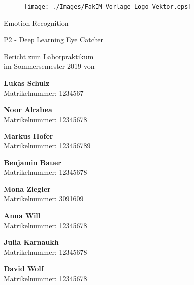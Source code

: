 \documentclass[12pt,a4paper,headinclude,twoside, plainheadsepline, open=right,numbers=noenddot]{scrreprt}
\begin{document}
\pagestyle{empty}

\clearscrheadings\clearscrplain

\begin{titlepage}
\begin{figure}[thb]
       \texttt{[image: ./Images/FakIM\_Vorlage\_Logo\_Vektor.eps]}
\end{figure}
\begin{center}
\rule{0pt}{0pt}
\vfill

\begin{huge}
Emotion Recognition\\[0.75ex]
\end{huge}
\begin{large}
P2 - Deep Learning Eye Catcher
\end{large}


\vfill
\vfill

Bericht zum Laborpraktikum\\
im Sommersemester 2019 von\\
\vfill
\setlength{\columnsep}{.0cm}
\begin{multicols}{1}

\textbf{Lukas Schulz}\\
Matrikelnummer: 1234567

\textbf{Noor Alrabea}\\
Matrikelnummer: 12345678
\end{multicols}

\begin{multicols}{2}
\textbf{Markus Hofer}\\
Matrikelnummer: 123456789

\textbf{Benjamin Bauer}\\
Matrikelnummer: 12345678
\end{multicols}

\begin{multicols}{2}
\textbf{Mona Ziegler}\\
Matrikelnummer: 3091609

\textbf{Anna Will}\\
Matrikelnummer: 12345678
\end{multicols}


\begin{multicols}{2}
\textbf{Julia Karnaukh}\\
Matrikelnummer: 12345678

\textbf{David Wolf}\\
Matrikelnummer: 12345678
\end{multicols}


\end{center}
\end{titlepage}
\end{document}
